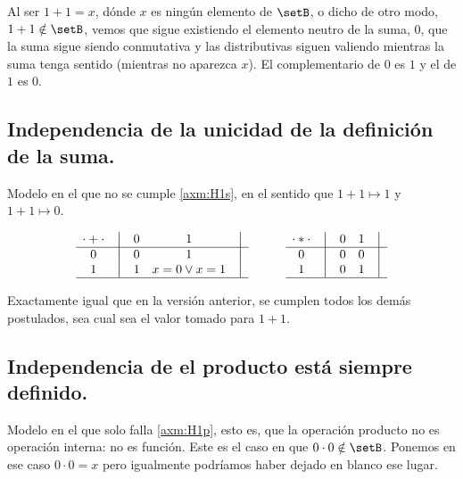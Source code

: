 	Al ser \(1 + 1 = x\), dónde \(x\) es ningún elemento de $\setB$, o dicho
de otro modo, \(1 + 1 \notin \setB\), vemos que sigue existiendo el elemento
neutro de la suma, \(0\), que la suma sigue siendo conmutativa y las
distributivas siguen valiendo mientras la suma tenga sentido (mientras no
aparezca \(x\)). El complementario de \(0\) es \(1\) y el de \(1\) es \(0\).



\subsection{Independencia de la unicidad de la definición de la suma.}

Modelo en el que no se cumple \ref{axm:H1s}, en el sentido que \(1 + 1
\mapsto 1\) y \(1 + 1 \mapsto 0\).


\[
    \begin{matrix}
        {\cdot + \cdot} & \big{\vert} & {0} & {1} & \big{\vert} \\
        \hline
        {0}             & \big{\vert} & {0} & {1} & \big{\vert} \\
        {1}             & \big{\vert} & {1} & {x=0 \vee x=1} & \big{\vert} \\
        \hline
    \end{matrix}
    \qquad\qquad
    \begin{matrix}
        {\cdot * \cdot} & \big{\vert} & {0} & {1} & \big{\vert} \\
        \hline
        {0}                   & \big{\vert} & {0} & {0} & \big{\vert} \\
        {1}                   & \big{\vert} & {0} & {1} & \big{\vert} \\
        \hline
    \end{matrix}
\]



Exactamente igual que en la versión anterior, se cumplen todos los demás
postulados, sea cual sea el valor tomado para \(1 + 1\).



\subsection{Independencia de el producto está siempre definido.}



	Modelo en el que solo falla \ref{axm:H1p}, esto es, que la operación
producto no es operación interna: no es función. Este es el caso en que
\( 0 \cdot 0 \notin \setB \). Ponemos en ese caso \(0 \cdot 0 = x\) pero
igualmente podríamos haber dejado en blanco ese lugar.



